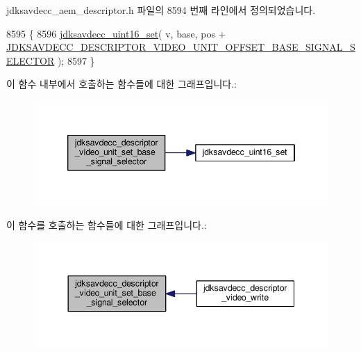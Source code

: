 jdksavdecc\+\_\+aem\+\_\+descriptor.\+h 파일의 8594 번째 라인에서 정의되었습니다.


\begin{DoxyCode}
8595 \{
8596     \hyperlink{group__endian_ga14b9eeadc05f94334096c127c955a60b}{jdksavdecc\_uint16\_set}( v, base, pos + 
      \hyperlink{group__descriptor__video_ga4b387d079f7f1d15f21c6d3047ee4723}{JDKSAVDECC\_DESCRIPTOR\_VIDEO\_UNIT\_OFFSET\_BASE\_SIGNAL\_SELECTOR}
       );
8597 \}
\end{DoxyCode}


이 함수 내부에서 호출하는 함수들에 대한 그래프입니다.\+:
\nopagebreak
\begin{figure}[H]
\begin{center}
\leavevmode
\includegraphics[width=346pt]{group__descriptor__video_ga79808fe9208b55f021685d15f68aa637_cgraph}
\end{center}
\end{figure}




이 함수를 호출하는 함수들에 대한 그래프입니다.\+:
\nopagebreak
\begin{figure}[H]
\begin{center}
\leavevmode
\includegraphics[width=344pt]{group__descriptor__video_ga79808fe9208b55f021685d15f68aa637_icgraph}
\end{center}
\end{figure}


